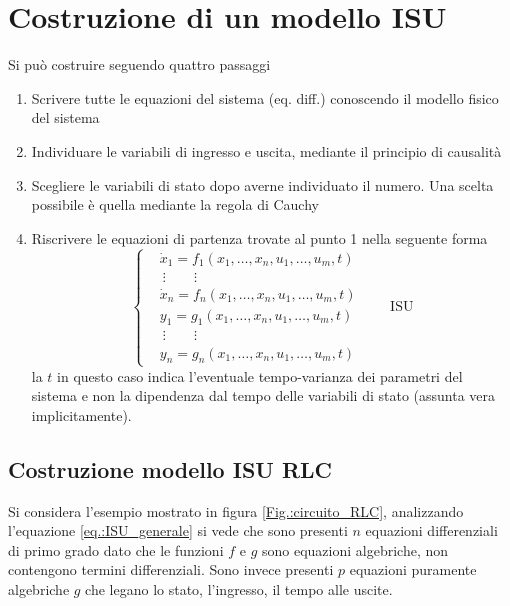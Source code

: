 \section{Costruzione di un modello ISU}
Si può costruire seguendo quattro passaggi
\begin{enumerate}
\item Scrivere tutte le equazioni del sistema (eq. diff.) conoscendo il modello fisico del sistema
\item Individuare le variabili di ingresso e uscita, mediante il principio di causalità
\item Scegliere le variabili di stato dopo averne individuato il numero. Una scelta possibile è
quella mediante la regola di Cauchy
\item Riscrivere le equazioni di partenza trovate al punto 1 nella seguente forma
\begin{equation}\left\{ \begin{aligned}
&\dot{x}_1 = f_1\left(x_1,\dots,x_n,u_1,\dots,u_m,t\right)\\
&\ \vdots \qquad \vdots\\
&\dot{x}_n = f_n\left(x_1,\dots,x_n,u_1,\dots,u_m,t\right)\\
&y_1 = g_1\left(x_1,\dots,x_n,u_1,\dots,u_m,t\right) \\
&\ \vdots \qquad \vdots\\
&y_n = g_n\left(x_1,\dots,x_n,u_1,\dots,u_m,t\right)
\end{aligned}\right.\qquad\text{ISU}
\label{eq.:ISU_generale}
\end{equation}
la $t$ in questo caso indica l'eventuale tempo-varianza dei parametri del sistema e non la
dipendenza dal tempo delle variabili di stato (assunta vera implicitamente).
\end{enumerate}

\subsection{Costruzione modello ISU RLC}
Si considera l'esempio mostrato in figura \ref{Fig.:circuito_RLC}, analizzando l'equazione
\ref{eq.:ISU_generale} si vede che sono presenti $n$ equazioni differenziali di primo grado dato
che le funzioni $f$ e $g$ sono equazioni algebriche, non contengono termini differenziali.
Sono invece presenti $p$ equazioni puramente algebriche $g$ che legano lo stato, l'ingresso, il
tempo alle uscite.

